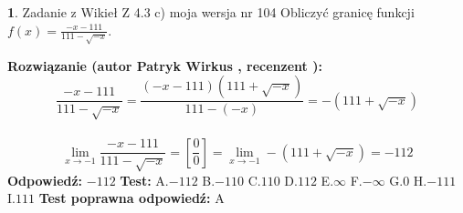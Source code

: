 \documentclass[12pt, a4paper]{article}
\theoremstyle{definition} %
\newtheorem{zad}{}
\newcommand{\zadStart}[1]{\begin{zad}#1\newline}
\newcommand{\zadStop}{\end{zad}}
\newcommand{\rozwStart}[2]{\noindent \textbf{Rozwiązanie (autor #1 , recenzent #2): }\newline}
\newcommand{\rozwStop}{\newline}
\newcommand{\odpStart}{\noindent \textbf{Odpowiedź:}\newline}
\newcommand{\odpStop}{\newline}
\newcommand{\testStart}{\noindent \textbf{Test:}\newline}
\newcommand{\testStop}{\newline}
\newcommand{\kluczStart}{\noindent \textbf{Test poprawna odpowiedź:}\newline}
\newcommand{\kluczStop}{\newline}
\begin{document}
\zadStart{Zadanie z Wikieł Z 4.3 c) moja wersja nr 104}
Obliczyć granicę funkcji $f(x)=\frac{-x-111}{111-\sqrt{-x}}$.
\zadStop
\rozwStart{Patryk Wirkus}{}
$$\frac{-x-111}{111-\sqrt{-x}}=\frac{(-x-111)(111+\sqrt{-x})}{111-(-x)}=-(111+\sqrt{-x})$$
\\
$$\lim\limits_{x\to-1}\frac{-x-111}{111-\sqrt{-x}}=[\frac{0}{0}]=\lim\limits_{x\to-1}-(111+\sqrt{-x}) =-112$$
\rozwStop
\odpStart
$-112$
\odpStop
\testStart
A.$-112$
B.$-110$
C.$110$
D.$112$
E.$\infty$
F.$-\infty$
G.$0$
H.$-111$
I.$111$
\testStop
\kluczStart
A
\kluczStop
\end{document}
